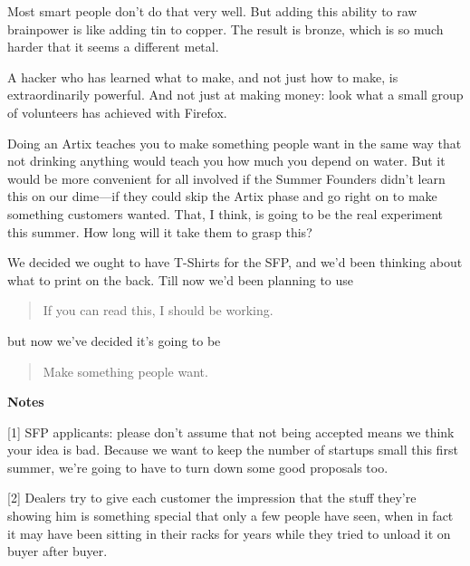 Most
                  smart people don't do that very well. But adding this ability
                  to raw brainpower is like adding tin to copper. The result is
                  bronze, which is so much harder that it seems a different
                  metal.

A hacker who has learned what to make, and
                  not just how to make, is extraordinarily powerful. And not
                  just at making money: look what a small group of volunteers
                  has achieved with Firefox.

Doing an Artix teaches
                  you to make something people want in the same way that not
                  drinking anything would teach you how much you depend on
                  water. But it would be more convenient for all involved if the
                  Summer Founders didn't learn this on our dime---if they
                  could skip the Artix phase and go right on to make something
                  customers wanted. That, I think, is going to be the real
                  experiment this summer. How long will it take them to grasp
                  this?


                  We decided we ought to have T-Shirts for the SFP, and we'd
                  been thinking about what to print on the back. Till now we'd
                  been planning to use
                  \begin{quote}

                    If you can read this, I should be working.
                  
\end{quote}

                  but now we've decided it's going to be
                  \begin{quote}
Make something people want.
\end{quote}

                  




                  \textbf{Notes}

[1] SFP applicants: please don't assume that not being accepted
                  means we think your idea is bad. Because we want to keep the
                  number of startups small this first summer, we're going to
                  have to turn down some good proposals too.

[2] Dealers try to give each customer the impression that the
                  stuff they're showing him is something special that only a few
                  people have seen, when in fact it may have been sitting in
                  their racks for years while they tried to unload it on buyer
                  after buyer.

